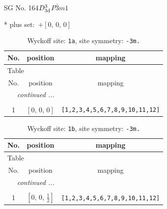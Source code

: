 \documentclass[fleqn,8pt]{jsarticle}
\begin{document}
\setcounter{MaxMatrixCols}{32}

\renewcommand{\tablename}{Table~}
\renewcommand{\figurename}{Figure~}
\begin{center}
\LARGE
SG No. 164\quad$D_{\rm 3d}^{3}$\quad$P\bar{3}m1$\quad[ trigonal ]
\end{center}
* plus set:\,\,\,$+\left[ 0,\, 0,\, 0 \right]$
\renewcommand{\arraystretch}{1.2}
\begin{longtable}{ccc}
\caption{Wyckoff site: {\tt 1a}, site symmetry: {\tt -3m.}}
 \\
 \hline \hline
No. & position & mapping \\ \hline \endfirsthead

\multicolumn{2}{l}{\tablename\ \thetable{}} \\
 \hline \hline
No. & position & mapping \\ \hline \endhead

 \hline \hline
\multicolumn{2}{r}{\footnotesize\it continued ...} \\ \endfoot

 \hline \hline
\multicolumn{2}{r}{} \\ \endlastfoot

1 & $\left[ 0,\, 0,\, 0 \right]$ & {\tt [1,2,3,4,5,6,7,8,9,10,11,12]} \\
\end{longtable}
\renewcommand{\arraystretch}{1.2}
\begin{longtable}{ccc}
\caption{Wyckoff site: {\tt 1b}, site symmetry: {\tt -3m.}}
 \\
 \hline \hline
No. & position & mapping \\ \hline \endfirsthead

\multicolumn{2}{l}{\tablename\ \thetable{}} \\
 \hline \hline
No. & position & mapping \\ \hline \endhead

 \hline \hline
\multicolumn{2}{r}{\footnotesize\it continued ...} \\ \endfoot

 \hline \hline
\multicolumn{2}{r}{} \\ \endlastfoot

1 & $\left[ 0,\, 0,\, \frac{1}{2} \right]$ & {\tt [1,2,3,4,5,6,7,8,9,10,11,12]} \\
\end{longtable}
\renewcommand{\arraystretch}{1.2}
\end{document}
